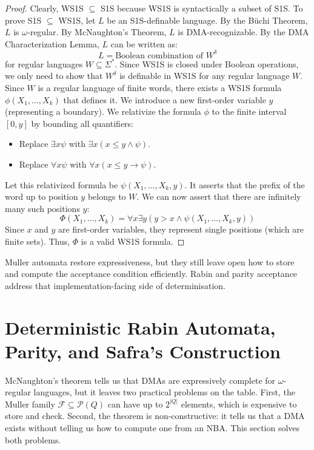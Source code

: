 \begin{proof}
Clearly, WS1S $\subseteq$ S1S because WS1S is syntactically a subset of S1S.
To prove S1S $\subseteq$ WS1S, let $L$ be an S1S-definable language. By the Büchi Theorem, $L$ is $\omega$-regular. By McNaughton's Theorem, $L$ is DMA-recognizable. By the DMA Characterization Lemma, $L$ can be written as:
$$L = \text{Boolean combination of } W^\delta$$
for regular languages $W \subseteq \Sigma^*$.
Since WS1S is closed under Boolean operations, we only need to show that $W^\delta$ is definable in WS1S for any regular language $W$.
Since $W$ is a regular language of finite words, there exists a WS1S formula $\phi(X_1, \dots, X_k)$ that defines it.
We introduce a new first-order variable $y$ (representing a boundary). We relativize the formula $\phi$ to the finite interval $[0, y]$ by bounding all quantifiers:
\begin{itemize}
    \item Replace $\exists x \psi$ with $\exists x (x \le y \land \psi)$.
    \item Replace $\forall x \psi$ with $\forall x (x \le y \to \psi)$.
\end{itemize}
Let this relativized formula be $\psi(X_1, \dots, X_k, y)$. It asserts that the prefix of the word up to position $y$ belongs to $W$.
We can now assert that there are infinitely many such positions $y$:
$$\Phi(X_1, \dots, X_k) = \forall x \exists y \left( y > x \land \psi(X_1, \dots, X_k, y) \right)$$
Since $x$ and $y$ are first-order variables, they represent single positions (which are finite sets). Thus, $\Phi$ is a valid WS1S formula.
\end{proof}

Muller automata restore expressiveness, but they still leave open how to store and compute the acceptance condition efficiently. Rabin and parity acceptance address that implementation-facing side of determinisation.

\section{Deterministic Rabin Automata, Parity, and Safra's Construction}
\label{sec:dra-safra}

McNaughton's theorem tells us that DMAs are expressively complete for $\omega$-regular languages, but it leaves two practical problems on the table. First, the Muller family $\mathcal{F} \subseteq \mathcal{P}(Q)$ can have up to $2^{|Q|}$ elements, which is expensive to store and check. Second, the theorem is non-constructive: it tells us that a DMA exists without telling us how to compute one from an NBA. This section solves both problems.

